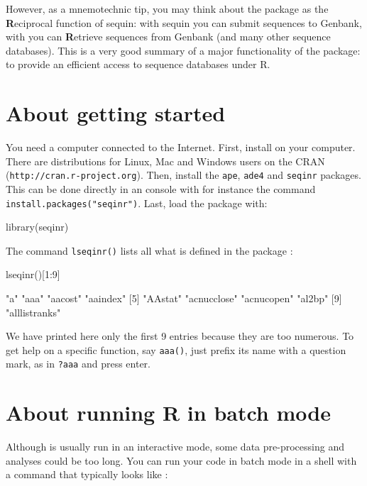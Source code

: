 \documentclass{article}
\begin{document}
However, as a mnemotechnic tip, you may think about the \seqinr{} package
as the {\bf{R}}eciprocal function of sequin: with sequin you can submit sequences
to Genbank, with \seqinr{} you can {\bf{R}}etrieve sequences from Genbank
(and many other sequence databases). This is
a very good summary of a major functionality of the \seqinr{} package: to
provide an efficient access to sequence databases under R.

\section{About getting started}

You need a computer connected to the Internet. First, install \Rlogo{} on your computer.
There are distributions for Linux, Mac and Windows users
on the CRAN (\texttt{http://cran.r-project.org}). Then, install the \texttt{ape}, 
\texttt{ade4} and \texttt{seqinr} packages. This can be done directly in an \Rlogo{} console
with for instance the command \texttt{install.packages("seqinr")}. 
Last, load the \seqinr{} package with:

\begin{Schunk}
\begin{Sinput}
library(seqinr)
\end{Sinput}
\end{Schunk}

The command \texttt{lseqinr()} lists all what is defined in the package \seqinr{}:

\begin{Schunk}
\begin{Sinput}
 lseqinr()[1:9]
\end{Sinput}
\begin{Soutput}
[1] "a"            "aaa"          "aacost"       "aaindex"     
[5] "AAstat"       "acnucclose"   "acnucopen"    "al2bp"       
[9] "alllistranks"
\end{Soutput}
\end{Schunk}

We have printed here only the first 9 entries because they are too numerous.
To get help on a specific function, say \texttt{aaa()}, just prefix its name
with a question mark, as in \texttt{?aaa} and press enter.

\section{About running R in batch mode}

Although \Rlogo{} is usually run in an interactive mode, some data pre-processing 
and analyses could be too long. You can run your \Rlogo{} code in batch mode
in a shell with a command that typically looks like :
\end{document}

